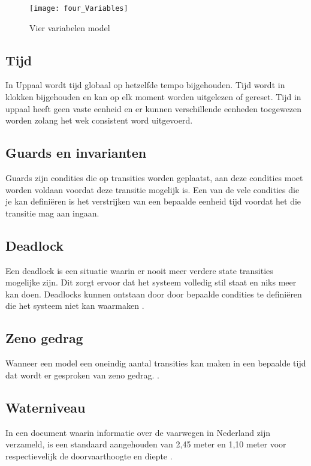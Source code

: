 \begin{figure}[!h]
	\centering
	\texttt{[image: four\_Variables]}
    \caption{Vier variabelen model \cite{thompson2000requirements}}
	\label{fig:four_Variables}
\end{figure}

\subsection{Tijd}
In Uppaal wordt tijd globaal op hetzelfde tempo bijgehouden. Tijd wordt in klokken bijgehouden en kan op elk moment worden uitgelezen of gereset. Tijd in uppaal heeft geen vaste eenheid en er kunnen verschillende eenheden toegewezen worden zolang het wek consistent word uitgevoerd. \cite{uppaalsmalltutorial}
\subsection{Guards en invarianten}
Guards zijn condities die op transities worden geplaatst, aan deze condities moet worden voldaan voordat deze transitie mogelijk is. Een van de vele condities die je kan definiëren is het verstrijken van een bepaalde eenheid tijd voordat het die transitie mag aan ingaan. \cite{uppaalsmalltutorial}

\subsection{Deadlock} \label{deadlock}

Een deadlock is een situatie waarin er nooit meer verdere state transities mogelijke zijn. Dit zorgt ervoor dat het systeem volledig stil staat en niks meer kan doen. Deadlocks kunnen ontstaan door door bepaalde condities te definiëren die het systeem niet kan waarmaken \cite{uppaalintro}.

\subsection{Zeno gedrag} \label{zenobehavior}
Wanneer een model een oneindig aantal transities kan maken in een bepaalde tijd dat wordt er gesproken van zeno gedrag. \cite{uppaaltutorialmodelingpatterns} \cite{leine2011zeno}.

\subsection{Waterniveau}

In een document waarin informatie over de vaarwegen in Nederland zijn verzameld, is een standaard aangehouden van 2,45 meter en 1,10 meter voor respectievelijk de doorvaarthoogte en diepte \cite{vaarwegennederland2017}. 